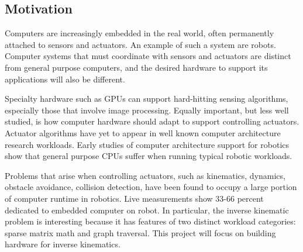 \subsection*{Motivation}

Computers are increasingly embedded in the real world, often permanently attached to sensors and actuators. An example of such a system are robots. Computer systems that must coordinate with sensors and actuators are distinct from general purpose computers, and the desired hardware to support its applications will also be different.

Specialty hardware such as GPUs can support hard-hitting sensing algorithms, especially those that involve image processing. Equally important, but less well studied, is how computer hardware should adapt to support controlling actuators. Actuator algorithms have yet to appear in well known computer architecture research workloads. Early studies of computer architecture support for robotics show that general purpose CPUs suffer when running typical robotic workloads\cite{Caselli}.

Problems that arise when controlling actuators, such as kinematics, dynamics, obstacle avoidance, collision detection, have been found to occupy a large portion of computer runtime in robotics. Live measurements show 33-66 percent dedicated to embedded computer on robot. In particular, the inverse kinematic problem is interesting because it has features of two distinct workload categories: sparse matrix math and graph traversal. This project will focus on building hardware for inverse kinematics.

